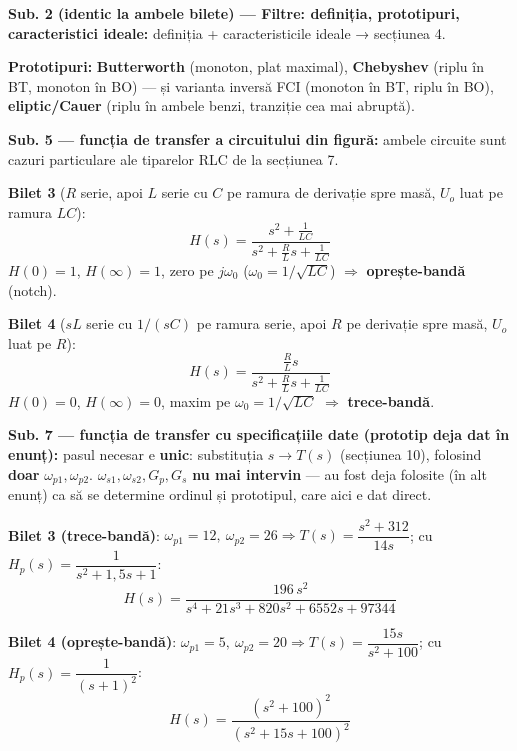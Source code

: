\documentclass[10pt,a4paper]{article}
\begin{document}
\textbf{Sub. 2 (identic la ambele bilete) — Filtre: definiția, prototipuri, caracteristici ideale:} definiția + caracteristicile ideale → secțiunea 4.
\begin{keyeq}\color{red!65!black}
\textbf{Prototipuri:} \textbf{Butterworth} (monoton, plat maximal), \textbf{Chebyshev} (riplu în BT, monoton în BO) — și varianta inversă FCI (monoton în BT, riplu în BO), \textbf{eliptic/Cauer} (riplu în ambele benzi, tranziție cea mai abruptă).
\end{keyeq}

\textbf{Sub. 5 — funcția de transfer a circuitului din figură:} ambele circuite sunt cazuri particulare ale tiparelor RLC de la secțiunea 7.
\begin{keyeq}\color{red!65!black}
\textbf{Bilet 3} ($R$ serie, apoi $L$ serie cu $C$ pe ramura de derivație spre masă, $U_o$ luat pe ramura $LC$):
$$H(s)=\dfrac{s^2+\frac{1}{LC}}{s^2+\frac{R}{L}s+\frac{1}{LC}}$$
$H(0)=1$, $H(\infty)=1$, zero pe $j\omega_0$ ($\omega_0=1/\sqrt{LC}$) $\Rightarrow$ \textbf{oprește-bandă} (notch).

\textbf{Bilet 4} ($sL$ serie cu $1/(sC)$ pe ramura serie, apoi $R$ pe derivație spre masă, $U_o$ luat pe $R$):
$$H(s)=\dfrac{\frac{R}{L}s}{s^2+\frac{R}{L}s+\frac{1}{LC}}$$
$H(0)=0$, $H(\infty)=0$, maxim pe $\omega_0=1/\sqrt{LC}$ $\Rightarrow$ \textbf{trece-bandă}.
\end{keyeq}

\textbf{Sub. 7 — funcția de transfer cu specificațiile date (prototip deja dat în enunț):} pasul necesar e \textbf{unic}: substituția $s\to T(s)$ (secțiunea 10), folosind \textbf{doar} $\omega_{p1},\omega_{p2}$. $\omega_{s1},\omega_{s2},G_p,G_s$ \textbf{nu mai intervin} — au fost deja folosite (în alt enunț) ca să se determine ordinul și prototipul, care aici e dat direct.
\begin{keyeq}\color{red!65!black}
\textbf{Bilet 3 (trece-bandă)}: $\omega_{p1}=12,\ \omega_{p2}=26\Rightarrow T(s)=\dfrac{s^2+312}{14s}$; cu $H_p(s)=\dfrac{1}{s^2+1{,}5s+1}$:
$$H(s)=\dfrac{196\,s^2}{s^4+21s^3+820s^2+6552s+97344}$$

\textbf{Bilet 4 (oprește-bandă)}: $\omega_{p1}=5,\ \omega_{p2}=20\Rightarrow T(s)=\dfrac{15s}{s^2+100}$; cu $H_p(s)=\dfrac{1}{(s+1)^2}$:
$$H(s)=\dfrac{(s^2+100)^2}{(s^2+15s+100)^2}$$
\end{keyeq}
\end{document}
